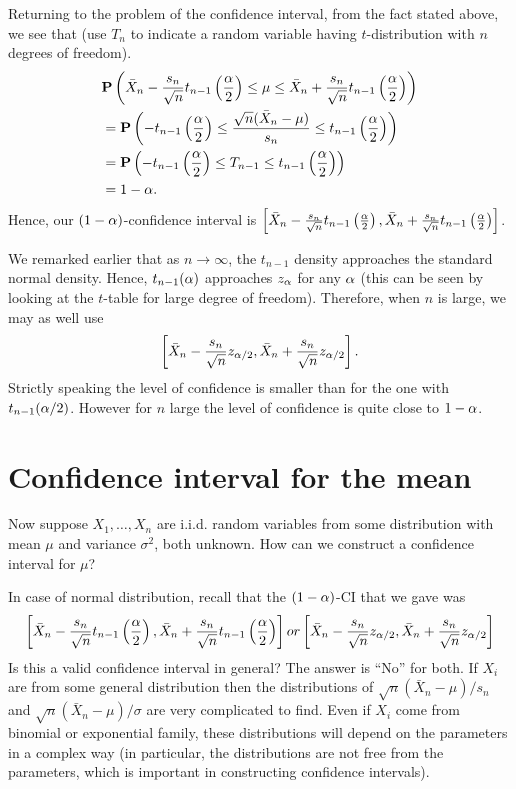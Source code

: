 \documentclass[preprint,  11pt]{amsart}
\def\sig{{\sigma}}
\begin{document}
Returning to the problem of the confidence interval, from the fact stated above, we see that (use $T_{n}$ to indicate a random variable having $t$-distribution with $n$ degrees of freedom).
\begin{align*}
& \mathbf{P}\left(\bar{X}_{n}-\frac{s_{n}}{\sqrt{n}}t_{n-1}\left(\frac{\alpha}{2}\right)\le \mu \le\bar{X}_{n}+\frac{s_{n}}{\sqrt{n}}t_{n-1}\left(\frac{\alpha}{2}\right) \right) \\
&=
\mathbf{P}\left(-t_{n-1}\left(\frac{\alpha}{2}\right)\le \frac{\sqrt{n}(\bar{X}_{n}-\mu)}{s_{n}}\le t_{n-1}\left(\frac{\alpha}{2}\right)\right) \\
&= \mathbf{P}\left(-t_{n-1}\left(\frac{\alpha}{2}\right)\le T_{n-1}\le t_{n-1}\left(\frac{\alpha}{2}\right)\right) \\
&= 1-\alpha.
\end{align*}
Hence, our $(1-\alpha)$-confidence interval is $\left[\bar{X}_{n}-\frac{s_{n}}{\sqrt{n}}t_{n-1}\left(\frac{\alpha}{2}\right),\bar{X}_{n}+\frac{s_{n}}{\sqrt{n}}t_{n-1}\left(\frac{\alpha}{2}\right)\right]$.

\berk We remarked earlier that as $n\to \infty$, the $t_{n-1}$ density approaches the standard normal density. Hence, $t_{n-1}(\alpha)$ approaches $z_{\alpha}$ for any $\alpha$ (this can be seen by looking at the $t$-table for large degree of freedom). Therefore, when $n$ is large, we may as well use
$$
\left[\bar{X}_{n}-\frac{s_{n}}{\sqrt{n}}z_{\alpha/2},\bar{X}_{n}+\frac{s_{n}}{\sqrt{n}}z_{\alpha/2}\right].
$$
Strictly speaking the level of confidence is smaller than for the one with $t_{n-1}(\alpha/2)$. However for $n$ large the level of confidence is quite close to $1-\alpha$.
\eerk


\section{Confidence interval for the mean}
Now suppose $X_{1},\ldots ,X_{n}$ are i.i.d. random variables from some distribution with mean $\mu$ and variance $\sig^{2}$, both unknown. How can we construct a confidence interval for $\mu$?

In case of normal distribution, recall that the $(1-\alpha)$-CI that we gave was
$$
\left[\bar{X}_{n}-\frac{s_{n}}{\sqrt{n}}t_{n-1}\left(\frac{\alpha}{2}\right),\bar{X}_{n}+\frac{s_{n}}{\sqrt{n}}t_{n-1}\left(\frac{\alpha}{2}\right)\right] or \left[\bar{X}_{n}-\frac{s_{n}}{\sqrt{n}}z_{\alpha/2},\bar{X}_{n}+\frac{s_{n}}{\sqrt{n}}z_{\alpha/2}\right]
$$
 Is this a valid confidence interval in general? The answer is ``No'' for both. If $X_{i}$ are from some general distribution then the distributions of $\sqrt{n}(\bar{X}_{n}-\mu)/s_{n}$ and $\sqrt{n}(\bar{X}_{n}-\mu)/\sig$ are very complicated to find. Even if $X_{i}$ come from binomial or exponential family, these distributions will depend on the parameters in a complex way (in particular, the distributions are not free from the parameters, which is important in constructing confidence intervals).
\end{document}
